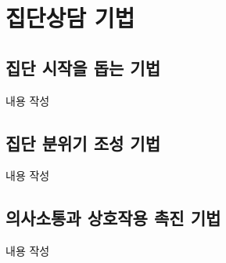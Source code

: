 \section{집단상담 기법}

\subsection{집단 시작을 돕는 기법}
내용 작성

\subsection{집단 분위기 조성 기법}
내용 작성

\subsection{의사소통과 상호작용 촉진 기법}
내용 작성
